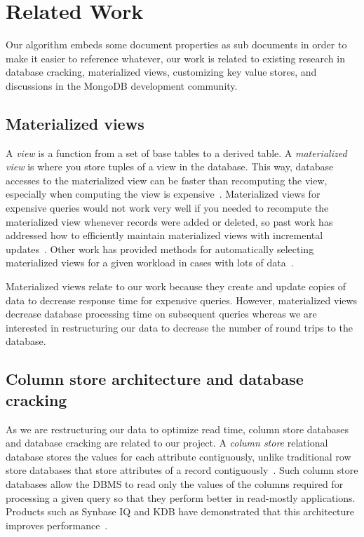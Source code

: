 \section{Related Work}

Our algorithm embeds some document properties as sub documents in order to make it easier to reference whatever, our work is related to existing research in database cracking, materialized views, customizing key value stores, and discussions in the MongoDB development community.

\subsection{Materialized views}
A {\em view} is a function from a set of base tables to a derived table. A {\em materialized view} is where you store tuples of a view in the database. This way, database accesses to the materialized view can be faster than recomputing the view, especially when computing the view is expensive~\cite{Gupta1995}. Materialized views for expensive queries would not work very well if you needed to recompute the materialized view whenever records were added or deleted, so past work has addressed how to efficiently maintain materialized views with incremental updates~\cite{Larson1985,Blakeley1986,Gupta1995,Zhou2007,Zhou2007a}. Other work has provided methods for automatically selecting materialized views for a given workload in cases with lots of data~\cite{Agrawal2000,Yang1997}. 

Materialized views relate to our work because they create and update copies of data to decrease response time for expensive queries. However, materialized views decrease database processing time on subsequent queries whereas we are interested in restructuring our data to decrease the number of round trips to the database. 

\subsection{Column store architecture and database cracking}
As we are restructuring our data to optimize read time, column store databases and database cracking are related to our project. A {\em column store} relational database stores the values for each attribute contiguously, unlike traditional row store databases that store attributes of a record contiguously~\cite{Stonebraker}. Such column store databases allow the DBMS to read only the values of the columns required for processing a given query so that they perform better in read-mostly applications. Products such as Synbase IQ and KDB have demonstrated that this architecture improves performance~\cite{Stonebraker,French1995}. 

